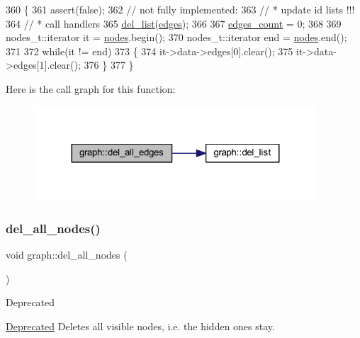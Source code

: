 \begin{DoxyCode}
360 \{
361     assert(\textcolor{keyword}{false});
362     \textcolor{comment}{// not fully implemented:}
363     \textcolor{comment}{//  * update id lists !!!}
364     \textcolor{comment}{//  * call handlers}
365     \mbox{\hyperlink{classgraph_a23f0a5fb311b7d71bb9dfc4e8aedef35}{del\_list}}(\mbox{\hyperlink{classgraph_ab5b1c610cca1bcf72b05aacc28a48153}{edges}});
366 
367     \mbox{\hyperlink{classgraph_af560ff4263ad165c166a46084e781b4a}{edges\_count}} = 0;
368     
369     nodes\_t::iterator it = \mbox{\hyperlink{classgraph_a4ea0592e8eb7c26c5abad24546907726}{nodes}}.begin();
370     nodes\_t::iterator end = \mbox{\hyperlink{classgraph_a4ea0592e8eb7c26c5abad24546907726}{nodes}}.end();
371 
372     \textcolor{keywordflow}{while}(it != end)
373     \{
374     it->data->edges[0].clear();
375     it->data->edges[1].clear();
376     \}
377 \}
\end{DoxyCode}
Here is the call graph for this function\+:
\nopagebreak
\begin{figure}[H]
\begin{center}
\leavevmode
\includegraphics[width=299pt]{classgraph_aae52be443c5aef001b5f6758855f15ad_cgraph}
\end{center}
\end{figure}
\mbox{\label{classgraph_ad0ca1578643a51f96a76a846f14558df}} 
\subsubsection{\texorpdfstring{del\+\_\+all\+\_\+nodes()}{del\_all\_nodes()}}
{\footnotesize\ttfamily void graph\+::del\+\_\+all\+\_\+nodes (\begin{DoxyParamCaption}{ }\end{DoxyParamCaption})}

\begin{DoxyRefDesc}{Deprecated}
\item[\mbox{\hyperlink{deprecated__deprecated000001}{Deprecated}}]Deletes all visible nodes, i.\+e. the hidden ones stay. \end{DoxyRefDesc}



